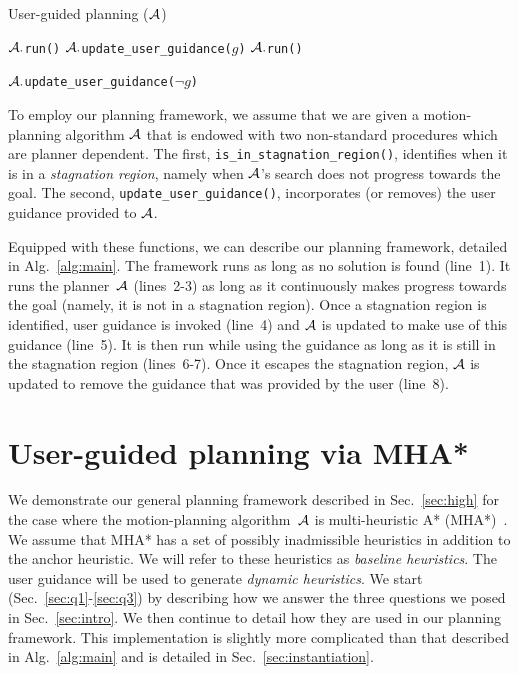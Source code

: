 \documentclass{article}
\begin{document}
\algrenewcommand\algorithmicindent{.8em}
\begin{algorithm}[tb]
\caption{User-guided planning ($\mathcal{A}$)}
\label{alg:main}	
\begin{algorithmic}[1]
\small
{} 
		\State $\mathcal{A}.$\texttt{run()}
	\EndWhile
%	
	\State $\mathcal{A}.$\texttt{update\_user\_guidance($g$)}
		\State $\mathcal{A}.$\texttt{run()}
	\EndWhile

	\State $\mathcal{A}.$\texttt{update\_user\_guidance($\neg g$)}
\EndWhile
\end{algorithmic}
\end{algorithm}

To employ our planning framework, we assume that we are given a motion-planning algorithm $\mathcal{A}$ that is endowed with two non-standard procedures which are planner dependent.
The first, \texttt{is\_in\_stagnation\_region()}, 
identifies when it is in a \emph{stagnation region}, namely when $\mathcal{A}$'s search does not progress towards the goal. 
The second, \texttt{update\_user\_guidance()}, 
incorporates (or removes) the user guidance provided to $\mathcal{A}$. 

Equipped with these functions, we can describe our planning framework, detailed in Alg.~\ref{alg:main}.
The framework runs as long as no solution is found (line~1).
It runs the planner~$\mathcal{A}$ (lines~2-3) as long as it continuously makes progress towards the goal (namely, it is not in a stagnation region).
Once a stagnation region is identified, user guidance is invoked (line~4) and $\mathcal{A}$  is updated to make use of this guidance (line~5).
It is then run while using the guidance as long as it is still in the stagnation region (lines~6-7).
Once it escapes the stagnation region, $\mathcal{A}$ is updated to remove the guidance that was provided by the user (line~8).


\section{User-guided planning via MHA*}
\label{sec:planning}

We demonstrate our general planning framework described in Sec.~\ref{sec:high} for the case where the motion-planning algorithm~$\mathcal{A}$ is multi-heuristic A* (MHA*)~\cite{ASNHL16}.
We assume that MHA* has a set of possibly inadmissible heuristics in addition to the anchor heuristic. We will refer to these heuristics as \emph{baseline heuristics}.
The user guidance will be used to generate \emph{dynamic heuristics}.
We start (Sec.~\ref{sec:q1}-\ref{sec:q3}) by describing how we answer the three questions we posed in Sec.~\ref{sec:intro}.
We then continue to detail how they are used in our planning framework.
This implementation is slightly more complicated than that described in Alg.~\ref{alg:main} and is detailed in Sec.~\ref{sec:instantiation}.
\end{document}
